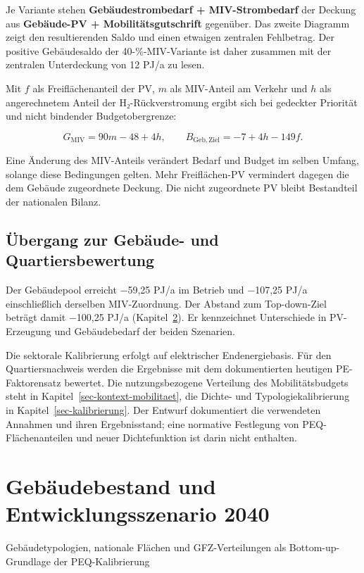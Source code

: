 \documentclass[
  ngerman,
  a4paper,
  DIV=11]{scrreprt}
\begin{document}
Je Variante stehen \textbf{Gebäudestrombedarf + MIV-Strombedarf} der
Deckung aus \textbf{Gebäude-PV + Mobilitätsgutschrift} gegenüber. Das
zweite Diagramm zeigt den resultierenden Saldo und einen etwaigen
zentralen Fehlbetrag. Der positive Gebäudesaldo der 40-\%-MIV-Variante
ist daher zusammen mit der zentralen Unterdeckung von 12 PJ/a zu lesen.

Mit \(f\) als Freiflächenanteil der PV, \(m\) als MIV-Anteil am Verkehr
und \(h\) als angerechnetem Anteil der H₂-Rückverstromung ergibt sich
bei gedeckter Priorität und nicht bindender Budgetobergrenze:

\[G_{\mathrm{MIV}}=90m-48+4h,\qquad B_{\mathrm{Geb,Ziel}}=-7+4h-149f.\]

Eine Änderung des MIV-Anteils verändert Bedarf und Budget im selben
Umfang, solange diese Bedingungen gelten. Mehr Freiflächen-PV vermindert
dagegen die dem Gebäude zugeordnete Deckung. Die nicht zugeordnete PV
bleibt Bestandteil der nationalen Bilanz.

\section{Übergang zur Gebäude- und
Quartiersbewertung}\label{uxfcbergang-zur-gebuxe4ude--und-quartiersbewertung}

Der Gebäudepool erreicht −59,25 PJ/a im Betrieb und −107,25 PJ/a
einschließlich derselben MIV-Zuordnung. Der Abstand zum Top-down-Ziel
beträgt damit −100,25 PJ/a (Kapitel~\ref{sec-gebaeudebestand}). Er
kennzeichnet Unterschiede in PV-Erzeugung und Gebäudebedarf der beiden
Szenarien.

Die sektorale Kalibrierung erfolgt auf elektrischer Endenergiebasis. Für
den Quartiersnachweis werden die Ergebnisse mit dem dokumentierten
heutigen PE-Faktorensatz bewertet. Die nutzungsbezogene Verteilung des
Mobilitätsbudgets steht in Kapitel~\ref{sec-kontext-mobilitaet}, die
Dichte- und Typologiekalibrierung in Kapitel~\ref{sec-kalibrierung}. Der
Entwurf dokumentiert die verwendeten Annahmen und ihren Ergebnisstand;
eine normative Festlegung von PEQ-Flächenanteilen und neuer
Dichtefunktion ist darin nicht enthalten.

\chapter{Gebäudebestand und Entwicklungsszenario
2040}\label{sec-gebaeudebestand}

Gebäudetypologien, nationale Flächen und GFZ-Verteilungen als
Bottom-up-Grundlage der PEQ-Kalibrierung
\end{document}
